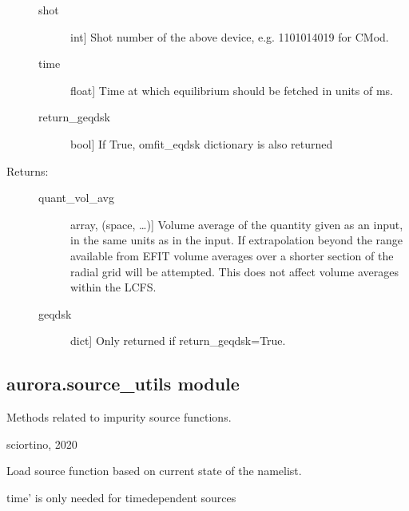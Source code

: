 \documentclass[letterpaper,10pt,english]{sphinxmanual}
\begin{document}
\begin{fulllineitems}
\begin{description}
\begin{description}
\item[{shot}] \leavevmode{[}int{]}
Shot number of the above device, e.g. 1101014019 for C\sphinxhyphen{}Mod.

\item[{time}] \leavevmode{[}float{]}
Time at which equilibrium should be fetched in units of ms.

\item[{return\_geqdsk}] \leavevmode{[}bool{]}
If True, omfit\_eqdsk dictionary is also returned

\end{description}

\item[{Returns:}] \leavevmode\begin{description}
\item[{quant\_vol\_avg}] \leavevmode{[}array, (space, …){]}
Volume average of the quantity given as an input, in the same units as in the input.
If extrapolation beyond the range available from EFIT volume averages over a shorter section
of the radial grid will be attempted. This does not affect volume averages within the LCFS.

\item[{geqdsk}] \leavevmode{[}dict{]}
Only returned if return\_geqdsk=True.

\end{description}

\end{description}

\end{fulllineitems}



\subsection{aurora.source\_utils module}
\label{\detokenize{aurora:module-aurora.source_utils}}\label{\detokenize{aurora:aurora-source-utils-module}}
Methods related to impurity source functions.

sciortino, 2020

\begin{fulllineitems}
\label{\detokenize{aurora:aurora.source_utils.get_aurora_source}}
Load source function based on current state of the namelist.

{\color{red}\bfseries{}\textasciigrave{}}time’ is only needed for time\sphinxhyphen{}dependent sources

\end{fulllineitems}
\end{document}
